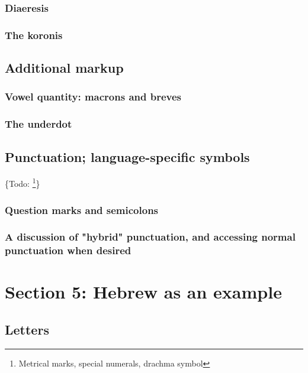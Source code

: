 \documentclass[11pt]{article}
\begin{document}
\subsubsection{Diaeresis}
\label{sec:org6a343cc}

\subsubsection{The koronis}
\label{sec:org3d1f845}

\subsection{Additional markup}
\label{sec:orgc8cb3c3}

\subsubsection{Vowel quantity: macrons and breves}
\label{sec:orgc2e1a69}

\subsubsection{The underdot}
\label{sec:org6b989e5}

\subsection{Punctuation; language-specific symbols}
\label{sec:orgf2bb527}

\{Todo: \footnote{Metrical marks, special numerals, drachma symbol}\}

\subsubsection{Question marks and semicolons}
\label{sec:orgdc12cf7}

\subsubsection{A discussion of "hybrid" punctuation, and accessing normal punctuation when desired}
\label{sec:org29b271f}

\section{Section 5: Hebrew as an example}
\label{sec:orgef0489b}

\subsection{Letters}
\label{sec:orgd8f8d33}
\end{document}
